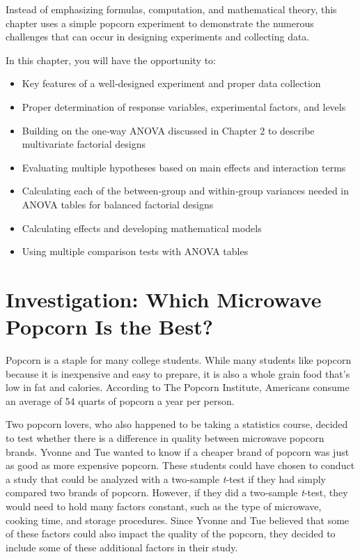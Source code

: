 \documentclass[
]{report}
\providecommand{\tightlist}{%
  \setlength{\itemsep}{0pt}\setlength{\parskip}{0pt}}
\begin{document}
Instead of emphasizing formulas, computation, and mathematical theory, this chapter uses a simple popcorn experiment to demonstrate the numerous challenges that can occur in designing experiments and collecting data.

In this chapter, you will have the opportunity to:

\begin{itemize}
\tightlist
\item
  Key features of a well‑designed experiment and proper data collection\\
\item
  Proper determination of response variables, experimental factors, and levels\\
\item
  Building on the one‑way ANOVA discussed in Chapter 2 to describe multivariate factorial designs\\
\item
  Evaluating multiple hypotheses based on main effects and interaction terms\\
\item
  Calculating each of the between‑group and within‑group variances needed in ANOVA tables for balanced factorial designs\\
\item
  Calculating effects and developing mathematical models\\
\item
  Using multiple comparison tests with ANOVA tables
\end{itemize}

\hypertarget{investigation-which-microwave-popcorn-is-the-best}{%
\section{\texorpdfstring{\textbf{Investigation: Which Microwave Popcorn Is the Best?}}{Investigation: Which Microwave Popcorn Is the Best?}}\label{investigation-which-microwave-popcorn-is-the-best}}

Popcorn is a staple for many college students. While many students like popcorn because it is inexpensive and easy to prepare, it is also a whole grain food that's low in fat and calories. According to The Popcorn Institute, Americans consume an average of 54 quarts of popcorn a year per person.

Two popcorn lovers, who also happened to be taking a statistics course, decided to test whether there is a difference in quality between microwave popcorn brands. Yvonne and Tue wanted to know if a cheaper brand of popcorn was just as good as more expensive popcorn. These students could have chosen to conduct a study that could be analyzed with a two‑sample \emph{t}‑test if they had simply compared two brands of popcorn. However, if they did a two‑sample \emph{t}‑test, they would need to hold many factors constant, such as the type of microwave, cooking time, and storage procedures. Since Yvonne and Tue believed that some of these factors could also impact the quality of the popcorn, they decided to include some of these additional factors in their study.
\end{document}
